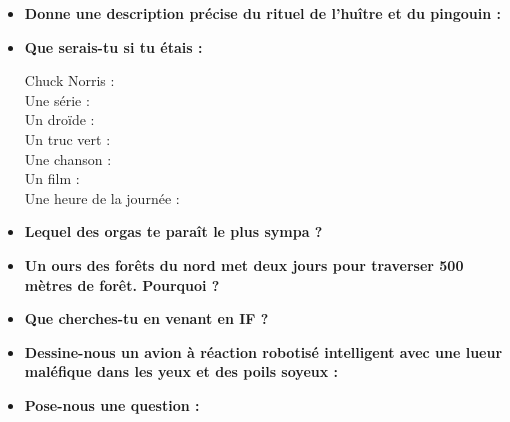 \begin{itemize}
    \item \textbf{Donne une description précise du rituel  
	 de l'huître et du pingouin :}
    \vspace{1cm}

    \item \textbf{Que serais-tu si tu étais :}
    \begin{description}
	\item[Chuck Norris :]
	\item[Une série :]
	\item[Un droïde :]
	\item[Un truc vert :]
	\item[Une chanson :]
	\item[Un film :]
	\item[Une heure de la journée :]
    \end{description}
    \item \textbf{Lequel des orgas te paraît le plus sympa ?}
    \vspace{1cm}
    \item \textbf{Un ours des forêts du nord met deux jours pour traverser 500 mètres de forêt. Pourquoi ?}
    \vspace{2cm}
    \item \textbf{Que cherches-tu en venant en IF ?}
    \vspace{3cm}
    \item \textbf{Dessine-nous un avion à réaction robotisé intelligent avec une
    lueur maléfique dans les yeux et des poils soyeux :}
    \vspace{5cm}
    \item \textbf{Pose-nous une question :}
    \vspace{2cm}
\end{itemize}
